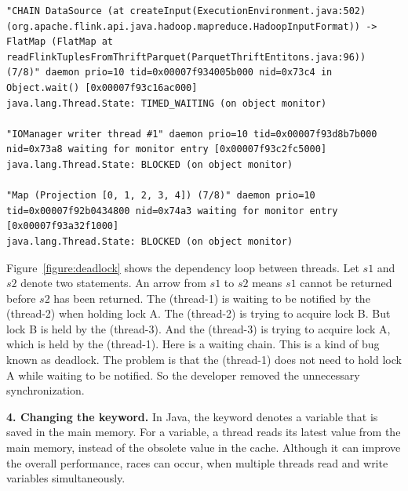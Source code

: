 \begin{lstlisting}
"CHAIN DataSource (at createInput(ExecutionEnvironment.java:502) (org.apache.flink.api.java.hadoop.mapreduce.HadoopInputFormat)) -> FlatMap (FlatMap at readFlinkTuplesFromThriftParquet(ParquetThriftEntitons.java:96)) (7/8)" daemon prio=10 tid=0x00007f934005b000 nid=0x73c4 in Object.wait() [0x00007f93c16ac000]
java.lang.Thread.State: TIMED_WAITING (on object monitor)

"IOManager writer thread #1" daemon prio=10 tid=0x00007f93d8b7b000 nid=0x73a8 waiting for monitor entry [0x00007f93c2fc5000]
java.lang.Thread.State: BLOCKED (on object monitor)

"Map (Projection [0, 1, 2, 3, 4]) (7/8)" daemon prio=10 tid=0x00007f92b0434800 nid=0x74a3 waiting for monitor entry [0x00007f93a32f1000]
java.lang.Thread.State: BLOCKED (on object monitor)
\end{lstlisting}

Figure~\ref{figure:deadlock} shows the dependency loop between threads. Let $s1$ and $s2$ denote two statements. An arrow from $s1$ to $s2$ means $s1$ cannot be returned before $s2$ has been returned. The  (thread-1) is waiting to be notified by the  (thread-2) when holding lock A. The  (thread-2) is trying to acquire lock B. But lock B is held by the  (thread-3). And the  (thread-3) is trying to acquire lock A, which is held by the  (thread-1). Here is a waiting chain. This is a kind of bug known as deadlock. The problem is that the  (thread-1) does not need to hold lock A while waiting to be notified. So the developer removed the unnecessary synchronization.




\noindent
\textbf{4. Changing the  keyword.} In Java, the  keyword denotes a variable that is saved in the main memory. For a  variable, a thread reads its latest value from the main memory, instead of the obsolete  value in the cache. Although it can improve the overall performance, races can occur, when multiple threads read and write  variables simultaneously.


